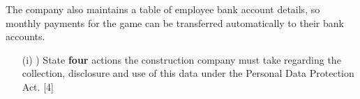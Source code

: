 The company also maintains a table of employee bank account details,
so monthly payments for the game can be transferred automatically
to their bank accounts.
\begin{enumerate}
\item[(i)] ) State \textbf{four} actions the construction company must take
regarding the collection, disclosure and use of this data under the
Personal Data Protection Act. \hfill{}{[}4{]}
\end{enumerate}